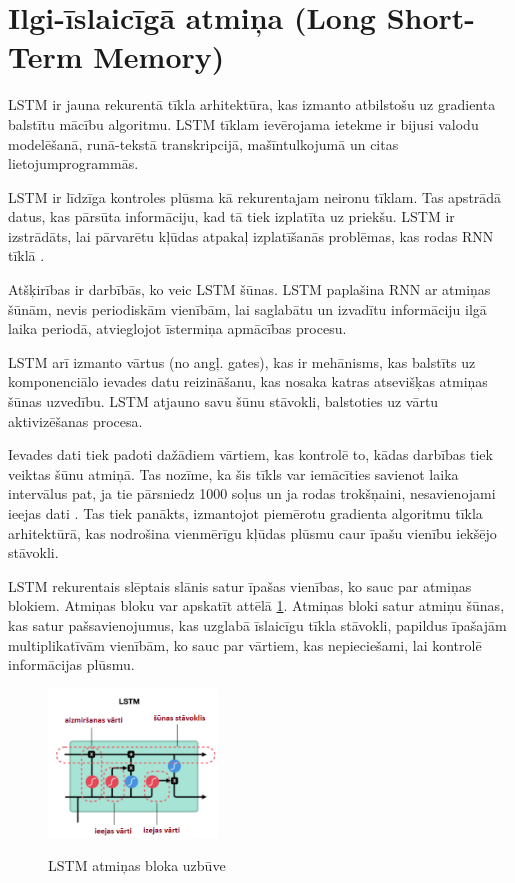 \documentclass[12pt,paper=A4]{report}
\begin{document}
\section{ Ilgi-īslaicīgā atmiņa (Long Short-Term Memory)}
LSTM ir jauna rekurentā tīkla arhitektūra, kas izmanto atbilstošu uz gradienta balstītu mācību algoritmu. LSTM tīklam ievērojama ietekme ir bijusi valodu modelēšanā, runā-tekstā transkripcijā, mašīntulkojumā un citas lietojumprogrammās. 

LSTM ir līdzīga kontroles plūsma kā rekurentajam neironu tīklam. Tas apstrādā datus, kas pārsūta informāciju, kad tā tiek izplatīta uz priekšu. LSTM ir izstrādāts, lai pārvarētu kļūdas atpakaļ izplatīšanās problēmas, kas rodas RNN tīklā \cite{DBLP:journals/corr/abs-1808-03314}. 

Atšķirības ir darbībās, ko veic LSTM šūnas. LSTM paplašina RNN ar atmiņas šūnām, nevis periodiskām vienībām, lai saglabātu un izvadītu informāciju ilgā laika periodā, atvieglojot īstermiņa apmācības procesu. 

LSTM arī izmanto vārtus (no angļ. gates), kas ir mehānisms, kas balstīts uz komponenciālo ievades datu reizināšanu, kas nosaka katras atsevišķas atmiņas šūnas uzvedību. LSTM atjauno savu šūnu stāvokli, balstoties uz vārtu aktivizēšanas procesa. 

Ievades dati tiek padoti dažādiem vārtiem, kas kontrolē to, kādas darbības tiek veiktas šūnu atmiņā. Tas nozīme, ka šis tīkls var iemācīties savienot laika intervālus pat, ja tie pārsniedz 1000 soļus un ja rodas trokšņaini, nesavienojami ieejas dati \cite{rnnLstm}. Tas tiek panākts, izmantojot piemērotu gradienta algoritmu tīkla arhitektūrā, kas nodrošina vienmērīgu kļūdas plūsmu caur īpašu vienību iekšējo stāvokli. 

LSTM rekurentais slēptais slānis satur īpašas vienības, ko sauc par atmiņas blokiem. Atmiņas bloku var apskatīt attēlā \ref{lstm}. Atmiņas bloki satur atmiņu šūnas, kas satur pašsavienojumus, kas uzglabā īslaicīgu tīkla stāvokli, papildus īpašajām multiplikatīvām vienībām, ko sauc par vārtiem, kas nepieciešami, lai kontrolē informācijas plūsmu. 

\begin{figure}[H] \centering
\includegraphics[width=0.40\textwidth]{lstmDeep} 
\caption{LSTM atmiņas bloka uzbūve} 
\cite{https://towardsdatascience.com/illustrated-guide-to-lstms-and-gru-s-a-step-by-step-explanation-44e9eb85bf21}
 \label{lstm} 
\end{figure}
\end{document}
